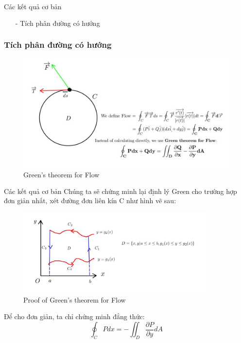 \documentclass[8pt]{beamer}
\begin{document}
\begin{frame}{Các kết quả cơ bản}
\begin{itemize}
	\item[-] Tích phân đường có hướng
\end{itemize}
\subsubsection{Tích phân đường có hướng}
\begin{figure}[h]
			\includegraphics[width=1\textwidth]{green1.jpg}
			\caption{Green's theorem for Flow}			\label{fig:re2}
\end{figure}

\end{frame}
\begin{frame}{Các kết quả cơ bản}
Chúng ta sẽ chứng minh lại định lý Green cho trường hợp đơn giản nhất, xét đường đơn liên kín C như hình vẽ sau:
\begin{figure}[h]
			\includegraphics[width=0.9\textwidth]{domain.jpg}
			\caption{Proof of Green's theorem for Flow}			\label{fig:re3}
\end{figure}
Để cho đơn giản, ta chỉ chứng minh đẳng thức: $$\oint_{C}Pdx=-\iint_{D}\frac{\partial P}{\partial y}dA$$
\end{frame}
\end{document}
